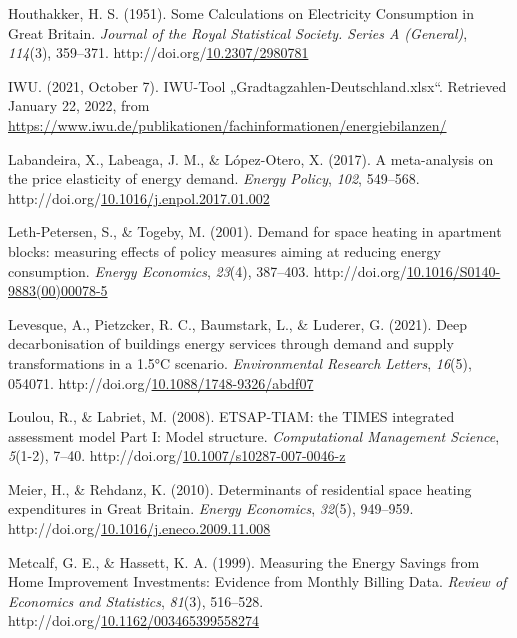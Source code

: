 \documentclass[12pt,twoside]{reedthesis}
\newlength{\cslhangindent}
\newenvironment{CSLReferences}[2] %
 {%
  \setlength{\parindent}{0pt}
  \ifodd #1 \everypar{\setlength{\hangindent}{\cslhangindent}}\ignorespaces\fi
  \ifnum #2 > 0
  \setlength{\parskip}{#2\baselineskip}
  \fi
 }%
 {}
\begin{document}
\begin{CSLReferences}{1}{0}
\leavevmode{}%
Houthakker, H. S. (1951). Some Calculations on Electricity Consumption in Great Britain. \emph{Journal of the Royal Statistical Society. Series A (General)}, \emph{114}(3), 359--371. http://doi.org/\href{https://doi.org/10.2307/2980781}{10.2307/2980781}

\leavevmode{}%
IWU. (2021, October 7). IWU-Tool „Gradtagzahlen-Deutschland.xlsx``. Retrieved January 22, 2022, from \url{https://www.iwu.de/publikationen/fachinformationen/energiebilanzen/}

\leavevmode{}%
Labandeira, X., Labeaga, J. M., \& López-Otero, X. (2017). A meta-analysis on the price elasticity of energy demand. \emph{Energy Policy}, \emph{102}, 549--568. http://doi.org/\href{https://doi.org/10.1016/j.enpol.2017.01.002}{10.1016/j.enpol.2017.01.002}

\leavevmode{}%
Leth-Petersen, S., \& Togeby, M. (2001). Demand for space heating in apartment blocks: measuring effects of policy measures aiming at reducing energy consumption. \emph{Energy Economics}, \emph{23}(4), 387--403. http://doi.org/\href{https://doi.org/10.1016/S0140-9883(00)00078-5}{10.1016/S0140-9883(00)00078-5}

\leavevmode{}%
Levesque, A., Pietzcker, R. C., Baumstark, L., \& Luderer, G. (2021). Deep decarbonisation of buildings energy services through demand and supply transformations in a 1.5°C scenario. \emph{Environmental Research Letters}, \emph{16}(5), 054071. http://doi.org/\href{https://doi.org/10.1088/1748-9326/abdf07}{10.1088/1748-9326/abdf07}

\leavevmode{}%
Loulou, R., \& Labriet, M. (2008). ETSAP-TIAM: the TIMES integrated assessment model Part I: Model structure. \emph{Computational Management Science}, \emph{5}(1-2), 7--40. http://doi.org/\href{https://doi.org/10.1007/s10287-007-0046-z}{10.1007/s10287-007-0046-z}

\leavevmode{}%
Meier, H., \& Rehdanz, K. (2010). Determinants of residential space heating expenditures in Great Britain. \emph{Energy Economics}, \emph{32}(5), 949--959. http://doi.org/\href{https://doi.org/10.1016/j.eneco.2009.11.008}{10.1016/j.eneco.2009.11.008}

\leavevmode{}%
Metcalf, G. E., \& Hassett, K. A. (1999). Measuring the Energy Savings from Home Improvement Investments: Evidence from Monthly Billing Data. \emph{Review of Economics and Statistics}, \emph{81}(3), 516--528. http://doi.org/\href{https://doi.org/10.1162/003465399558274}{10.1162/003465399558274}


\end{CSLReferences}
\end{document}
